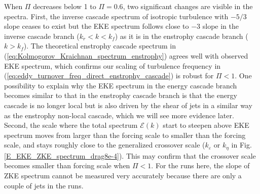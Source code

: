 \documentclass{ametsoc}
\begin{document}
When $\Pi$ decreases below 1 to $\Pi=0.6$, two significant changes
are visible in the spectra. First, the inverse cascade spectrum of 
isotropic turbulence with $-5/3$ slope ceases to exist but the EKE
spectrum follows close to $-3$ slope in the inverse cascade branch 
($k_{r}<k<k_{f}$) as it is in the  enstrophy cascade branch ($k>k_{f}$). 
The theoretical enstrophy cascade spectrum in (\ref{eq:Kolmogorov_Kraichnan_spectrum_enstrophy})
agrees well with observed EKE spectrum, which confirms our scaling of turbulence
frequency in (\ref{eq:eddy_turnover_freq_direct_enstrophy_cascade}) 
is robust for $\Pi<1$. One possibility to explain why the EKE spectrum 
in the energy cascade branch becomes similar to that in the enstrophy
cascade branch is that the energy cascade is no longer local but is also 
driven by the shear of jets in a similar way as the enstrophy 
non-local cascade, which we will see more evidence later.
Second, the scale where the total spectrum $\mathcal{E}(k)$ start to
steepen above EKE spectrum moves from larger than the forcing scale to
smaller than the forcing scale, and stays roughly close to the generalized
crossover scale ($k_\varepsilon$ or $k_\eta$ in Fig. \ref{E_EKE_ZKE_spectrum_drag8e-4}).
This may confirm that the crossover scale becomes smaller than forcing
scale when $\Pi<1$. For the runs here, the slope of ZKE spectrum
cannot be measured very accurately because there are only a couple of 
jets in the runs.
\end{document}
